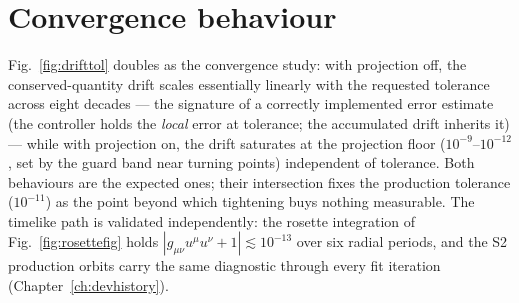 \section{Convergence behaviour}
\label{sec:convergence}

Fig.~\ref{fig:drifttol} doubles as the convergence study: with
projection off, the conserved-quantity drift scales essentially linearly
with the requested tolerance across eight decades — the signature of a
correctly implemented error estimate (the controller holds the
\emph{local} error at tolerance; the accumulated drift inherits it) —
while with projection on, the drift saturates at the projection floor
($10^{-9}$--$10^{-12}$, set by the guard band near turning points)
independent of tolerance. Both behaviours are the expected ones; their
intersection fixes the production tolerance ($10^{-11}$) as the point
beyond which tightening buys nothing measurable. The
timelike path is validated independently: the rosette integration of
Fig.~\ref{fig:rosettefig} holds $|g_{\mu\nu}u^\mu u^\nu + 1| \lesssim
10^{-13}$ over six radial periods, and the S2 production orbits carry
the same diagnostic through every fit iteration
(Chapter~\ref{ch:devhistory}).

